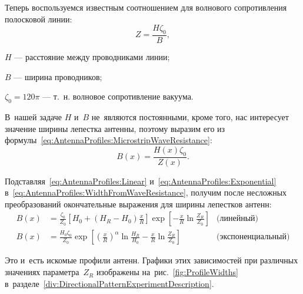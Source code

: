 Теперь воспользуемся известным соотношением для волнового сопротивления
полосковой линии:
\begin{equation}
    \label{eq:AntennaProfiles:MicrostripWaveResistance}
    Z = \frac{H\zeta_0}{B},
\end{equation}
%
\begin{where}
\item $H$ --- расстояние между проводниками линии;
\item $B$ --- ширина проводников;
\item $\zeta_0=120\pi$ --- т.~н. волновое сопротивление вакуума.
\end{where}

\noindent
В~нашей задаче $H$ и~$B$ не~являются постоянными, кроме того, нас интересует
значение ширины лепестка антенны, поэтому выразим его из
формулы~\eqref{eq:AntennaProfiles:MicrostripWaveResistance}:
\begin{equation}
    \label{eq:AntennaProfiles:WidthFromWaveResistance}
    B(x) = \frac{H(x)\zeta_0}{Z(x)}.
\end{equation}

Подставляя~\eqref{eq:AntennaProfiles:Linear} и~\eqref{eq:AntennaProfiles:Exponential}
в~\eqref{eq:AntennaProfiles:WidthFromWaveResistance}, получим после несложных
преобразований окончательные выражения для ширины лепестков антенн:
\begin{align}
    \label{eq:AntennaProfiles:LinearWidth}
    B(x) &= \frac{\zeta_0}{Z_0}
    \left[ H_0 + (H_R-H_0)\frac{x}{R} \right]
    \exp\left[
        -\frac{x}{R}\ln\frac{Z_R}{Z_0}
    \right] & \text{(линейный)} \\
    \label{eq:AntennaProfiles:ExponentialWidth}
    B(x) &= \frac{H_0\zeta_0}{Z_0}
    \exp\left[
        \left(\frac{x}{R}\right)^\alpha \ln\frac{H_R}{H_0} -
        \frac{x}{R} \ln\frac{Z_R}{Z_0}
    \right] & \text{(экспоненциальный)}
\end{align}

Это и~есть искомые профили антенн. Графики этих зависимостей при различных
значениях параметра~$Z_R$ изображены на~рис.~\ref{fig:ProfileWidths}
в~разделе~\ref{div:DirectionalPatternExperimentDescription}.

